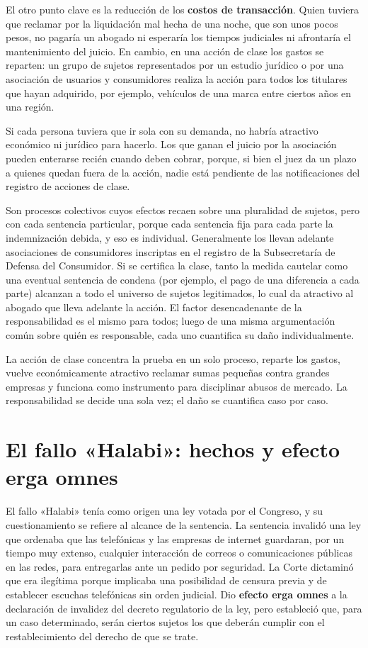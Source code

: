 \documentclass[12pt,oneside]{book}
\begin{document}
El otro punto clave es la reducción de los \textbf{costos de transacción}. Quien tuviera que reclamar por la liquidación mal hecha de una noche, que son unos pocos pesos, no pagaría un abogado ni esperaría los tiempos judiciales ni afrontaría el mantenimiento del juicio. En cambio, en una acción de clase los gastos se reparten: un grupo de sujetos representados por un estudio jurídico o por una asociación de usuarios y consumidores realiza la acción para todos los titulares que hayan adquirido, por ejemplo, vehículos de una marca entre ciertos años en una región.

Si cada persona tuviera que ir sola con su demanda, no habría atractivo económico ni jurídico para hacerlo. Los que ganan el juicio por la asociación pueden enterarse recién cuando deben cobrar, porque, si bien el juez da un plazo a quienes quedan fuera de la acción, nadie está pendiente de las notificaciones del registro de acciones de clase.

Son procesos colectivos cuyos efectos recaen sobre una pluralidad de sujetos, pero con cada sentencia particular, porque cada sentencia fija para cada parte la indemnización debida, y eso es individual. Generalmente los llevan adelante asociaciones de consumidores inscriptas en el registro de la Subsecretaría de Defensa del Consumidor. Si se certifica la clase, tanto la medida cautelar como una eventual sentencia de condena (por ejemplo, el pago de una diferencia a cada parte) alcanzan a todo el universo de sujetos legitimados, lo cual da atractivo al abogado que lleva adelante la acción. El factor desencadenante de la responsabilidad es el mismo para todos; luego de una misma argumentación común sobre quién es responsable, cada uno cuantifica su daño individualmente.

\begin{important}
La acción de clase concentra la prueba en un solo proceso, reparte los gastos, vuelve económicamente atractivo reclamar sumas pequeñas contra grandes empresas y funciona como instrumento para disciplinar abusos de mercado. La responsabilidad se decide una sola vez; el daño se cuantifica caso por caso.
\end{important}

\section{El fallo «Halabi»: hechos y efecto erga omnes}

El fallo «Halabi» tenía como origen una ley votada por el Congreso, y su cuestionamiento se refiere al alcance de la sentencia. La sentencia invalidó una ley que ordenaba que las telefónicas y las empresas de internet guardaran, por un tiempo muy extenso, cualquier interacción de correos o comunicaciones públicas en las redes, para entregarlas ante un pedido por seguridad. La Corte dictaminó que era ilegítima porque implicaba una posibilidad de censura previa y de establecer escuchas telefónicas sin orden judicial. Dio \textbf{efecto erga omnes} a la declaración de invalidez del decreto regulatorio de la ley, pero estableció que, para un caso determinado, serán ciertos sujetos los que deberán cumplir con el restablecimiento del derecho de que se trate.
\end{document}

